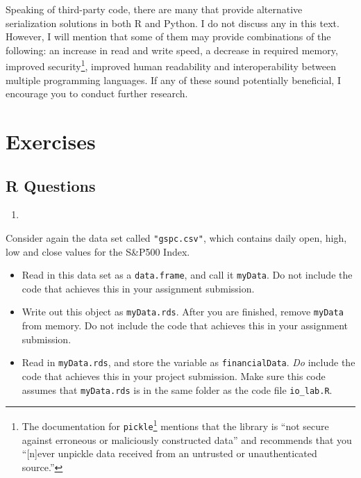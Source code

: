 \documentclass[12pt,krantz2]{krantz}
\providecommand{\tightlist}{%
  \setlength{\itemsep}{0pt}\setlength{\parskip}{0pt}}
\renewcommand{\href}[2]{#2\footnote{\url{#1}}}
\begin{document}
Speaking of third-party code, there are many that provide alternative serialization solutions in both R and Python. I do not discuss any in this text. However, I will mention that some of them may provide combinations of the following: an increase in read and write speed, a decrease in required memory, improved security\footnote{The \href{https://docs.python.org/2/library/pickle.html}{documentation for \texttt{pickle}} mentions that the library is ``not secure against erroneous or maliciously constructed data'' and recommends that you ``{[}n{]}ever unpickle data received from an untrusted or unauthenticated source.''}, improved human readability and interoperability between multiple programming languages. If any of these sound potentially beneficial, I encourage you to conduct further research.

\hypertarget{exercises-7}{%
\section{Exercises}\label{exercises-7}}

\hypertarget{r-questions-7}{%
\subsection{R Questions}\label{r-questions-7}}

\begin{enumerate}
\def\labelenumi{\arabic{enumi}.}
\item
\end{enumerate}

Consider again the data set called \texttt{"gspc.csv"}, which contains daily open, high, low and close values for the S\&P500 Index.

\begin{itemize}
\tightlist
\item
  Read in this data set as a \texttt{data.frame}, and call it \texttt{myData}. Do not include the code that achieves this in your assignment submission.
\item
  Write out this object as \texttt{myData.rds}. After you are finished, remove \texttt{myData} from memory. Do not include the code that achieves this in your assignment submission.
\item
  Read in \texttt{myData.rds}, and store the variable as \texttt{financialData}. \emph{Do} include the code that achieves this in your project submission. Make sure this code assumes that \texttt{myData.rds} is in the same folder as the code file \texttt{io\_lab.R}.
\end{itemize}
\end{document}
